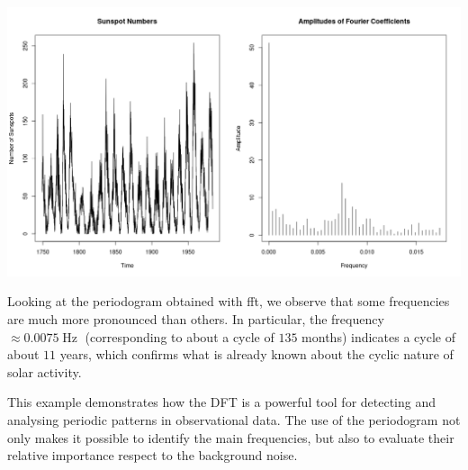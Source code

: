 \begin{center}
	\centering
	\includegraphics[width=\textwidth]{Figures/sunspots.png}
\end{center}

\noindent Looking at the periodogram obtained with \gls{fft}, we observe that some frequencies are much more pronounced than others. In particular, the frequency $\approx 0.0075\operatorname{\mathrm{Hz}}$ (corresponding to about a cycle of $135$ months) indicates a cycle of about $11$ years, which confirms what is already known about the cyclic nature of solar activity.

\noindent This example demonstrates how the DFT is a powerful tool for detecting and analysing periodic patterns in observational data. The use of the periodogram not only makes it possible to identify the main frequencies, but also to evaluate their relative importance respect to the background noise.
